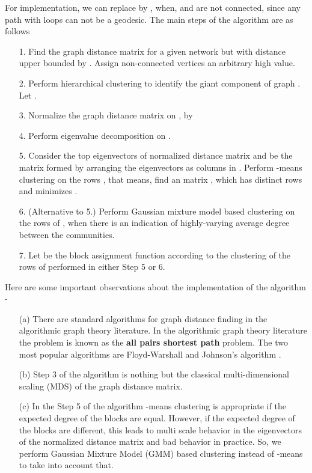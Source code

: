 \documentclass[graybox]{svmult}
\begin{document}
For implementation, we can replace  by , when,  and  are not connected, since any path with loops can not be a geodesic. The main steps of the algorithm are as follows
\begin{enumerate}
\item[1.] Find the graph distance matrix  for a given network but with distance upper bounded by . Assign non-connected vertices an arbitrary high value.
\item[2.] Perform hierarchical clustering to identify the giant component  of graph . Let .
\item[3.] Normalize the graph distance matrix on ,  by 

\item[4.] Perform eigenvalue decomposition on .
\item[5.] Consider the top  eigenvectors of normalized distance matrix  and  be the  matrix formed by arranging the  eigenvectors as columns in . Perform -means clustering on the rows , that means, find an  matrix , which has  distinct rows and minimizes .
\item[6.] (Alternative to 5.) Perform Gaussian mixture model based clustering on the rows of , when there is an indication of highly-varying average degree between the communities.
\item[7.] Let  be the block assignment function according to the clustering of the rows of  performed in either Step 5 or 6.
\end{enumerate}
Here are some important observations about the implementation of the algorithm -
\begin{itemize}
\item[(a)] \hspace{0.02in} There are standard algorithms for graph distance finding in the algorithmic graph theory literature. In the algorithmic graph theory literature the problem is known as the \textbf{all pairs shortest path} problem. The two most popular algorithms are Floyd-Warshall \cite{floyd1962algorithm} \cite{warshall1962theorem} and Johnson's algorithm \cite{johnson1977efficient}. 
\item[(b)] \hspace{0.02in} Step 3 of the algorithm is nothing but the classical multi-dimensional scaling (MDS) of the graph distance matrix. 
\item[(c)] \hspace{0.02in} In the Step 5 of the algorithm -means clustering is appropriate if the expected degree of the blocks are equal. However, if the expected degree of the blocks are different, this leads to multi scale behavior in the eigenvectors of the normalized distance matrix and bad behavior in practice. So, we perform Gaussian Mixture Model (GMM) based clustering instead of -means to take into account that.
\end{itemize}
\end{document}
